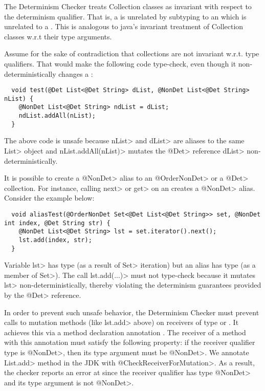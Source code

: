 The Determinism Checker treats Collection classes as
invariant with respect to the determinism qualifier. That is, a
 is unrelated by subtyping to an 
which is unrelated to a .
This is analogous to java's invariant treatment of Collection classes
w.r.t their type arguments.

Assume for the sake of contradiction that collections are not invariant w.r.t. type qualifiers.
That would make the following code type-check, even though it
non-deterministically changes a :
\begin{Verbatim}
  void test(@Det List<@Det String> dList, @NonDet List<@Det String> nList) {
    @NonDet List<@Det String> ndList = dList;
    ndList.addAll(nList);
  }
\end{Verbatim}

The above code is unsafe because \<nList> and \<dList> are aliases to
the same \<List> object and \<nList.addAll(nList)> mutates the \<@Det>
reference \<dList> non-deterministically.

It is possible to create a \<@NonDet> alias to an \<@OrderNonDet> or a \<@Det> collection.
For instance, calling \<next> or \<get> on an  creates a
\<@NonDet> alias.
Consider the example below:
\begin{Verbatim}
  void aliasTest(@OrderNonDet Set<@Det List<@Det String>> set, @NonDet int index, @Det String str) {
    @NonDet List<@Det String> lst = set.iterator().next();
    lst.add(index, str);
  }
\end{Verbatim}

Variable \<lst> has type  (as a result of \<Set> iteration)
but an alias has type  (as a member of \<Set>).
The call \<lst.add(...)> must not type-check because it mutates \<lst> non-deterministically,
thereby violating the determinism guarantees provided by the \<@Det> reference.

In order to prevent such unsafe behavior, the Determinism Checker must
prevent calls to mutation methods (like \<lst.add> above) on receivers of
type  or .
It achieves this via a method declaration annotation
.
The receiver of a method with this annotation must satisfy the following property: if the
receiver qualifier type is \<@NonDet>, then its type argument must be \<@NonDet>.
We annotate \<List.add> method in the JDK with \<@CheckReceiverForMutation>.
As a result, the checker reports an error at 
since the receiver qualifier has type \<@NonDet> and its type argument is not \<@NonDet>.

